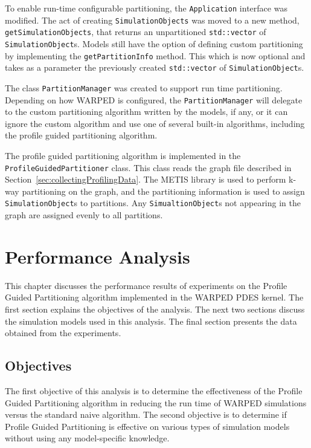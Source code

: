 \documentclass[11pt]{book}
\begin{document}
To enable run-time configurable partitioning, the \texttt{Application} interface was modified. The act of creating \texttt{SimulationObjects} was moved to a new method, \texttt{getSimulationObjects}, that returns an unpartitioned \texttt{std::vector} of \texttt{SimulationObject}s. Models still have the option of defining custom partitioning by implementing the \texttt{getPartitionInfo} method. This which is now optional and takes as a parameter the previously created \texttt{std::vector} of \texttt{SimulationObject}s.

The class \texttt{PartitionManager} was created to support run time partitioning. Depending on how WARPED is configured, the \texttt{PartitionManager} will delegate to the custom partitioning algorithm written by the models, if any, or it can ignore the custom algorithm and use one of several built-in algorithms, including the profile guided partitioning algorithm.

The profile guided partitioning algorithm is implemented in the \texttt{ProfileGuidedPartitioner} class. This class reads the graph file described in Section~\ref{sec:collectingProfilingData}. The METIS library is used to perform k-way partitioning on the graph, and the partitioning information is used to assign \texttt{SimulationObject}s to partitions. Any \texttt{SimualtionObject}s not appearing in the graph are assigned evenly to all partitions.

\chapter{Performance Analysis}\label{analysis}

This chapter discusses the performance results of experiments on the Profile Guided Partitioning algorithm implemented in the WARPED PDES kernel. The first section explains the objectives of the analysis. The next two sections discuss the simulation models used in this analysis. The final section presents the data obtained from the experiments.

\section{Objectives}

The first objective of this analysis is to determine the effectiveness of the Profile Guided Partitioning algorithm in reducing the run time of WARPED simulations versus the standard naive algorithm. The second objective is to determine if Profile Guided Partitioning is effective on various types of simulation models without using any model-specific knowledge.
\end{document}
